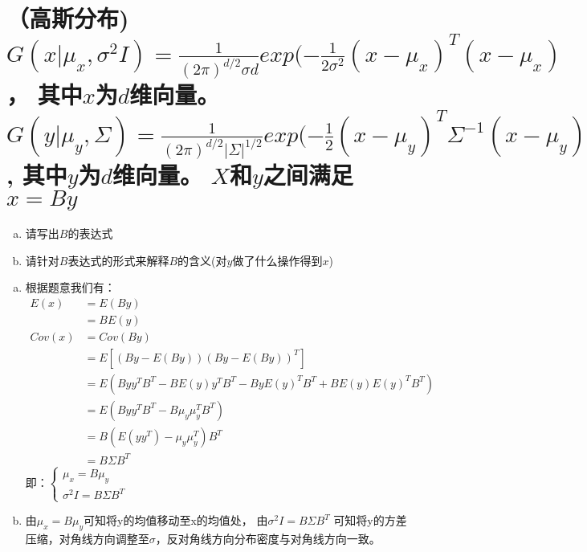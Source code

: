 \documentclass[11pt]{article}
\newenvironment{answer}{\par\color{MidnightBlue}}{\par}
\begin{document}
\section{（高斯分布)
$G(x|\mu_x, \sigma^2I) = \frac{1}{(2\pi)^{d/2}\sigma d}exp{(-\frac{1}{2\sigma^2} (x - \mu_x)^T(x - \mu_x)}$，
其中$x$为$d$维向量。
$G(y|\mu_y, \Sigma) = \frac{1}{(2\pi)^{d/2}|\Sigma|^{1/2}}exp{(-\frac{1}{2} (x - \mu_y)^T\Sigma^{-1}(x - \mu_y)}$,
其中$y$为$d$维向量。
$X$和$y$之间满足$x = By$}
\begin{enumerate}[(a)]
    \item 请写出$B$的表达式
    \item 请针对$B$表达式的形式来解释$B$的含义(对$y$做了什么操作得到$x$)
\end{enumerate}
\begin{answer}
\begin{enumerate}[(a)]
    \item
根据题意我们有： \begin{align*}
  E(x) &= E(By) \\
       &= BE(y) \\
  Cov(x) &= Cov(By) \\
         &= E[(By-E(By))(By-E(By))^T] \\
         &= E(Byy^TB^T - BE(y)y^TB^T - ByE(y)^TB^T + BE(y)E(y)^TB^T) \\
         &= E(Byy^TB^T - B\mu_y\mu_y^TB^T) \\
         &= B(E(yy^T)-\mu_y\mu_y^T)B^T \\
         &= B\Sigma B^T
\end{align*}
即：$\begin{cases}
      \mu_x = B\mu_y \\
  \sigma^2I = B\Sigma B^T
\end{cases}$
    \item 由$\mu_x = B\mu_y$可知将y的均值移动至x的均值处，
      由$\sigma^2I = B\Sigma B^T$ 可知将y的方差压缩，对角线方向调整至$\sigma$，反对角线方向分布密度与对角线方向一致。
\end{enumerate}
\end{answer}
\end{document}

